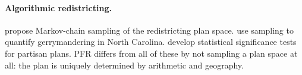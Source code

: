 \paragraph{Algorithmic redistricting.}
\citet{duchin2019gerrychain} propose Markov-chain sampling of the redistricting
plan space. \citet{herschlag2020quantifying} use sampling to quantify
gerrymandering in North Carolina. \citet{chikina2017assessing} develop
statistical significance tests for partisan plans. PFR differs from all of
these by not sampling a plan space at all: the plan is uniquely determined by
arithmetic and geography.
